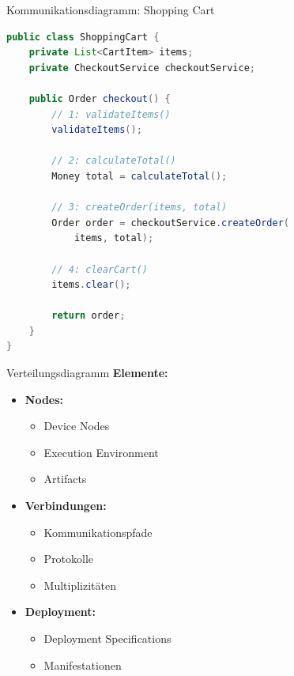 \begin{example2}{Kommunikationsdiagramm: Shopping Cart}
\begin{lstlisting}[language=Java, style=basesmol]
public class ShoppingCart {
    private List<CartItem> items;
    private CheckoutService checkoutService;
    
    public Order checkout() {
        // 1: validateItems()
        validateItems();
        
        // 2: calculateTotal()
        Money total = calculateTotal();
        
        // 3: createOrder(items, total)
        Order order = checkoutService.createOrder(
            items, total);
            
        // 4: clearCart()
        items.clear();
        
        return order;
    }
}
\end{lstlisting}
\end{example2}

\begin{definition}{Verteilungsdiagramm}
\textbf{Elemente:}
\begin{itemize}
    \item \textbf{Nodes:}
    \begin{itemize}
        \item Device Nodes
        \item Execution Environment
        \item Artifacts
    \end{itemize}
    
    \item \textbf{Verbindungen:}
    \begin{itemize}
        \item Kommunikationspfade
        \item Protokolle
        \item Multiplizitäten
    \end{itemize}
    
    \item \textbf{Deployment:}
    \begin{itemize}
        \item Deployment Specifications
        \item Manifestationen
    \end{itemize}
\end{itemize}
\end{definition}


